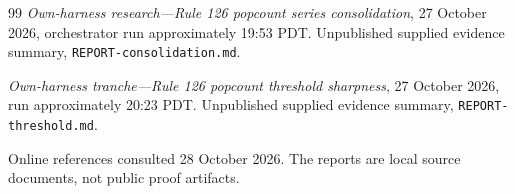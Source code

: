 \documentclass[11pt]{article}
\begin{document}
\begin{thebibliography}{99}
\emph{Own-harness research---Rule 126 popcount series consolidation},
27 October 2026, orchestrator run approximately 19:53 PDT.
Unpublished supplied evidence summary, \texttt{REPORT-consolidation.md}.

\emph{Own-harness tranche---Rule 126 popcount threshold sharpness},
27 October 2026, run approximately 20:23 PDT.
Unpublished supplied evidence summary, \texttt{REPORT-threshold.md}.

\end{thebibliography}

\noindent\small Online references consulted 28 October 2026. The reports
are local source documents, not public proof artifacts.
\end{document}
